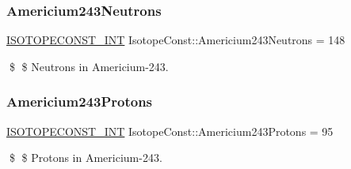 \subsubsection{\texorpdfstring{Americium243\+Neutrons}{Americium243Neutrons}}
{\footnotesize\ttfamily \mbox{\hyperlink{group___isotope_const-_macros_ga5f18360b3e99483a35c32d789e62621c}{I\+S\+O\+T\+O\+P\+E\+C\+O\+N\+S\+T\+\_\+\+I\+NT}} Isotope\+Const\+::\+Americium243\+Neutrons = 148}

\$ \$ Neutrons in Americium-\/243. \mbox{\label{group___isotope_const-_americium-_am243_ga235b0ae186ca269d32ac9ca00ed77a71}} 
\subsubsection{\texorpdfstring{Americium243\+Protons}{Americium243Protons}}
{\footnotesize\ttfamily \mbox{\hyperlink{group___isotope_const-_macros_ga5f18360b3e99483a35c32d789e62621c}{I\+S\+O\+T\+O\+P\+E\+C\+O\+N\+S\+T\+\_\+\+I\+NT}} Isotope\+Const\+::\+Americium243\+Protons = 95}

\$ \$ Protons in Americium-\/243. 